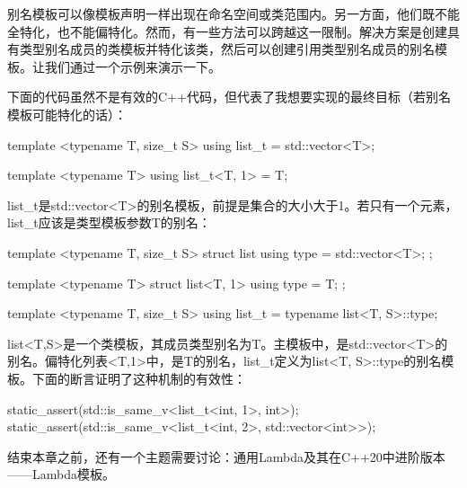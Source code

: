别名模板可以像模板声明一样出现在命名空间或类范围内。另一方面，他们既不能全特化，也不能偏特化。然而，有一些方法可以跨越这一限制。解决方案是创建具有类型别名成员的类模板并特化该类，然后可以创建引用类型别名成员的别名模板。让我们通过一个示例来演示一下。

下面的代码虽然不是有效的C++代码，但代表了我想要实现的最终目标（若别名模板可能特化的话）：

\begin{cppcode}
template <typename T, size_t S>
using list_t = std::vector<T>;

template <typename T>
using list_t<T, 1> = T;
\end{cppcode}

list_t是std::vector<T>的别名模板，前提是集合的大小大于1。若只有一个元素，list_t应该是类型模板参数T的别名：

\begin{cppcode}
template <typename T, size_t S>
struct list
{
	using type = std::vector<T>;
};

template <typename T>
struct list<T, 1>
{
	using type = T;
};

template <typename T, size_t S>
using list_t = typename list<T, S>::type;
\end{cppcode}

list<T,S>是一个类模板，其成员类型别名为T。主模板中，是std::vector<T>的别名。偏特化列表<T,1>中，是T的别名，list_t定义为list<T, S>::type的别名模板。下面的断言证明了这种机制的有效性：

\begin{cppcode}
static_assert(std::is_same_v<list_t<int, 1>, int>);
static_assert(std::is_same_v<list_t<int, 2>,
std::vector<int>>);
\end{cppcode}

结束本章之前，还有一个主题需要讨论：通用Lambda及其在C++20中进阶版本——Lambda模板。




















